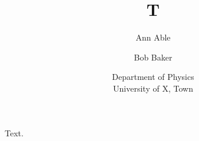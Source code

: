 \documentclass{article}
\author{Ann Able \and Bob Baker}
\title{T}
\date{Department of Physics\\ University of X, Town}
\begin{document}
\maketitle
Text.
\end{document}
